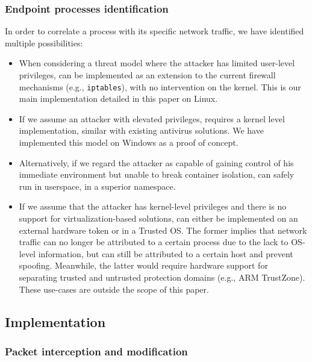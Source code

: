 \subsubsection{Endpoint processes identification}
\label{appfw:daf:arch-endpoint}

In order to correlate a process with its specific network traffic, we have identified multiple possibilities:
\begin{itemize}
    \item When considering a threat model where the attacker has limited user-level privileges, \daf{} can be implemented as an extension to the current firewall mechanisms (e.g., \texttt{iptables}), with no intervention on the kernel. This is our main implementation detailed in this paper on Linux. 
    \item If we assume an attacker with elevated privileges, \daf{} requires a kernel level implementation, similar with existing antivirus solutions. We have implemented this model on Windows as a proof of concept.
    \item Alternatively, if we regard the attacker as capable of gaining control of his immediate environment but unable to break container isolation, \daf{} can safely run in userspace, in a superior namespace.
    \item If we assume that the attacker has kernel-level privileges and there is no support for virtualization-based solutions, \daf{} can either be implemented on an external hardware token or in a Trusted OS. The former implies that network traffic can no longer be attributed to a certain process due to the lack to OS-level information, but can still be attributed to a certain host and prevent spoofing. Meanwhile, the latter would require hardware support for separating trusted and untrusted protection domains (e.g., ARM TrustZone). These use-cases are outside the scope of this paper.
\end{itemize}

\subsection{Implementation}
\label{appfw:daf:implementation}

\subsubsection{Packet interception and modification}


